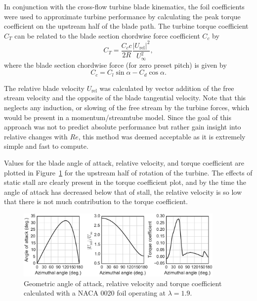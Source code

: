 \documentclass[energies,article,accept,moreauthors,pdftex,12pt,a4paper]{mdpi}
\begin{document}
In conjunction with the cross-flow turbine blade kinematics, the foil
coefficients were used to approximate turbine performance by calculating the
peak torque coefficient on the upstream half of the blade path. The turbine
torque coefficient $C_T$ can be related to the blade section chordwise force
coefficient $C_c$ by
\begin{equation}
C_T = \frac{C_c c}{2R} \frac{|U_\mathrm{rel}|^2}{U_\infty^2},
\end{equation}
where the blade section chordwise force (for zero preset pitch) is given by
\begin{equation}
C_c = C_l \sin \alpha - C_d \cos \alpha.
\end{equation}

The relative blade velocity $U_\mathrm{rel}$ was calculated by vector addition
of the free stream velocity and the opposite of the blade tangential velocity.
Note that this neglects any induction, or slowing of the free stream by the
turbine forces, which would be present in a momentum/streamtube model. Since the
goal of this approach was not to predict absolute performance but rather gain
insight into relative changes with $Re$, this method was deemed acceptable as it
is extremely simple and fast to compute.

Values for the blade angle of attack, relative velocity, and torque coefficient
are plotted in Figure~\ref{fig:blade-kinematics} for the upstream half of
rotation of the turbine. The effects of static stall are clearly present in the
torque coefficient plot, and by the time the angle of attack has decreased below
that of stall, the relative velocity is so low that there is not much
contribution to the torque coefficient.

\begin{figure}[ht!]
\centering

\includegraphics[width=0.9\textwidth]{figures/foil_kinematics_ct}

\caption{Geometric angle of attack, relative velocity and torque coefficient
    calculated with a NACA 0020 foil operating at $\lambda=1.9$.}

\label{fig:blade-kinematics}
\end{figure}
\end{document}
